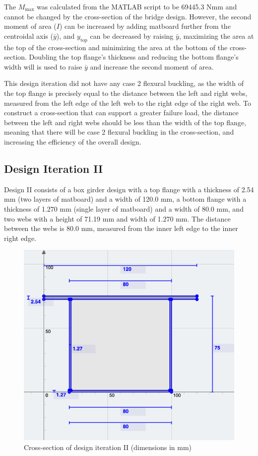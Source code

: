 \documentclass[11pt]{article}
\newcommand{\imagewidth}{.5\linewidth}
\begin{document}
The $M_\mathrm{max}$ was calculated from the MATLAB script to be 69445.3 Nmm and cannot be changed by the cross-section of the bridge design. However, the second moment of area ($I$) can be increased by adding matboard further from the centroidal axis ($\bar{y}$), and $y_{\mathrm{top}}$ can be decreased by raising $\bar{y}$, maximizing the area at the top of the cross-section and minimizing the area at the bottom of the cross-section. Doubling the top flange's thickness and reducing the bottom flange's width will is used to raise $\bar{y}$ and increase the second moment of area.

This design iteration did not have any case 2 flexural buckling, as the width of the top flange is precisely equal to the distance between the left and right webs, measured from the left edge of the left web to the right edge of the right web. To construct a cross-section that can support a greater failure load, the distance between the left and right webs should be less than the width of the top flange, meaning that there will be case 2 flexural buckling in the cross-section, and increasing the efficiency of the overall design.

\subsection{Design Iteration II}

Design II consists of a box girder design with a top flange with a thickness of 2.54 mm (two layers of matboard) and a width of 120.0 mm, a bottom flange with a thickness of 1.270 mm (single layer of matboard) and a width of 80.0 mm, and two webs with a height of 71.19 mm and width of 1.270 mm. The distance between the webs is 80.0 mm, measured from the inner left edge to the inner right edge.

\begin{figure}[h]
    \centering
    \includegraphics[width=\imagewidth]{img/design-2-cs.png}
    \caption{Cross-section of design iteration II (dimensions in mm)}
    \label{d2}
\end{figure}
\end{document}
